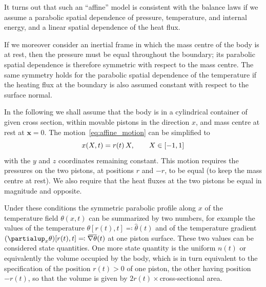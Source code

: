 \documentclass[\ifafour a4paper,12pt,\else a5paper,10pt,\fi%
onecolumn,oneside,article,%
british%
]{memoir}
\theoremstyle{remark}
\theoremstyle{innote}
\newcommand*{\de}{\partialup}%
\newcommand*{\defs}{\eqqcolon}
\DeclarePairedDelimiter\clcl{[}{]}
\renewcommand*{\|}[1][]{\nonscript\,#1\vert\nonscript\;\mathopen{}}
\newcommand*{\widebar}[1]{{\mkern1.5mu\skew{2}\overline{\mkern-1.5mu#1\mkern-1.5mu}\mkern 1.5mu}}
\newcommand*{\yr}{r}
\newcommand*{\yt}{\theta}
\newcommand*{\yx}{\bm{x}}
\newcommand*{\ytb}{\hat{\yt}}
\newcommand*{\ygb}{\widebar{\nabla\yt}}
\begin{document}
It turns out that such an \enquote{affine} model is consistent with the
balance laws if we assume a parabolic spatial dependence of pressure,
temperature, and internal energy, and a linear spatial dependence of the
heat flux.

If we moreover consider an inertial frame in which the mass centre of the
body is at rest, then the pressure must be equal throughout the boundary;
its parabolic spatial dependence is therefore symmetric with respect to the
mass centre. The same symmetry holds for the parabolic spatial dependence
of the temperature if the heating flux at the boundary is also assumed
constant with respect to the surface normal.

In the following we shall assume that the body is in a cylindrical
container of given cross section, within movable pistons in the direction
$x$, and mass centre at rest at $\yx = 0$. The
motion~\eqref{eq:affine_motion} can be simplified to
\begin{equation}
  \label{eq:simplified_affine_motion}
  x(X,t) = \yr(t) \, X, \qquad X \in \clcl{-1, 1}
\end{equation}
with the $y$ and $z$ coordinates remaining constant. This motion requires
the pressures on the two pistons, at positions $\yr$ and $-\yr$, to be
equal (to keep the mass centre at rest). We also require that the heat
fluxes at the two pistons be equal in magnitude and opposite.

Under these conditions the symmetric parabolic profile along $x$ of the
temperature field $\yt(x, t)$ can be summarized by two numbers, for example
the values of the temperature $\yt[\yr(t), t] \defs \ytb(t)$ and of the
temperature gradient $(\de_{x}\yt)[\yr(t), t] \defs \ygb(t)$ at one piston
surface. These two values can be considered state quantities. One more
state quantity is the uniform $n(t)$ or equivalently the volume occupied by
the body, which is in turn equivalent to the specification of the position
$\yr(t) > 0$ of one piston, the other having position $-\yr(t)$, so that
the volume is given by $2 \yr(t) \times{}$cross-sectional area.
\end{document}
